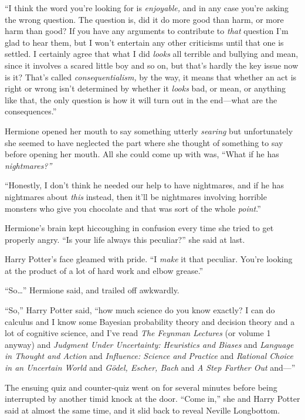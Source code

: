 ``I think the word you're looking for is \emph{enjoyable,} and in any
case you're asking the wrong question. The question is, did it do more
good than harm, or more harm than good? If you have any arguments to
contribute to \emph{that} question I'm glad to hear them, but I won't
entertain any other criticisms until that one is settled. I certainly
agree that what I did \emph{looks} all terrible and bullying and mean,
since it involves a scared little boy and so on, but that's hardly the
key issue now is it? That's called \emph{consequentialism,} by the way,
it means that whether an act is right or wrong isn't determined by
whether it \emph{looks} bad, or mean, or anything like that, the only
question is how it will turn out in the end---what are the
consequences.''

Hermione opened her mouth to say something utterly \emph{searing} but
unfortunately she seemed to have neglected the part where she thought of
something to say before opening her mouth. All she could come up with
was, ``What if he has \emph{nightmares?''}

``Honestly, I don't think he needed our help to have nightmares, and if
he has nightmares about \emph{this} instead, then it'll be nightmares
involving horrible monsters who give you chocolate and that was sort of
the whole \emph{point}.''

Hermione's brain kept hiccoughing in confusion every time she tried to
get properly angry. ``Is your life always this peculiar?'' she said at
last.

Harry Potter's face gleamed with pride. ``I \emph{make} it that
peculiar. You're looking at the product of a lot of hard work and elbow
grease.''

``So\ldots{}'' Hermione said, and trailed off awkwardly.

``So,'' Harry Potter said, ``how much science do you know exactly? I can
do calculus and I know some Bayesian probability theory and decision
theory and a lot of cognitive science, and I've read \emph{The Feynman
Lectures} (or volume 1 anyway) and \emph{Judgment Under Uncertainty:
Heuristics and Biases} and \emph{Language in Thought and Action} and
\emph{Influence: Science and Practice} and \emph{Rational Choice in an
Uncertain World} and \emph{Gödel, Escher, Bach} and \emph{A Step Farther
Out} and---''

The ensuing quiz and counter-quiz went on for several minutes before
being interrupted by another timid knock at the door. ``Come in,'' she
and Harry Potter said at almost the same time, and it slid back to
reveal Neville Longbottom.

